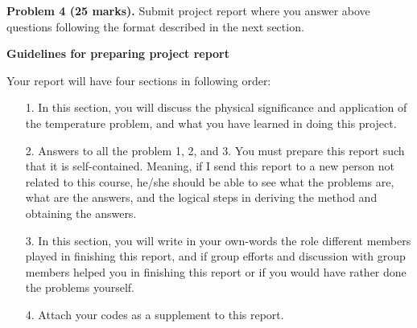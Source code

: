 \documentclass[11pt,a4paper]{report}
\begin{document}
\vspace{10pt}
\noindent\textbf{Problem 4 (25 marks).}  Submit project report where you answer above questions following the format described in the next section.

\vspace{10pt}
\begin{center}
\textbf{\Large Guidelines for preparing project report} 
\end{center}
Your report will have four sections in following order:
\begin{itemize}
\item[1.] In this section, you will discuss the physical significance and application of the temperature problem, and what you have learned in doing this project.
\item[2.] Answers to all the problem 1, 2, and 3. You must prepare this report such that it is self-contained. Meaning, if I send this report to a new person not related to this course, he/she should be able to see what the problems are, what are the answers, and the logical steps in deriving the method and obtaining the answers.
\item[3.] In this section, you will write in your own-words the role different members played in finishing this report, and if group efforts and discussion with group members helped you in finishing this report or if you would have rather done the problems yourself. 
\item[4.] Attach your codes as a supplement to this report.
\end{itemize}
\end{document}
